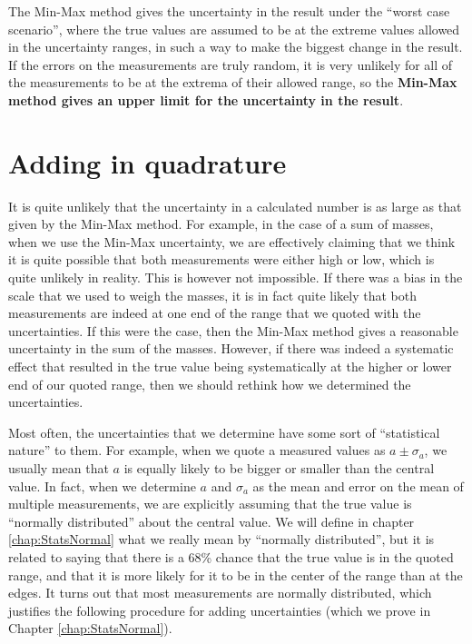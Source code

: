 The Min-Max method gives the uncertainty in the result under the ``worst case scenario'', where the true values are assumed to be at the extreme values allowed in the uncertainty ranges, in such a way to make the biggest change in the result. If the errors on the measurements are truly random, it is very unlikely for all of the measurements to be at the extrema of their allowed range, so the \textbf{Min-Max method gives an upper limit for the uncertainty in the result}. 

\section{Adding in quadrature}
It is quite unlikely that the uncertainty in a calculated number is as large as that given by the Min-Max method. For example, in the case of a sum of masses, when we use the Min-Max uncertainty, we are effectively claiming that we think it is quite possible that both measurements were either high or low, which is quite unlikely in reality. This is however not impossible. If there was a bias in the scale that we used to weigh the masses, it is in fact quite likely that both measurements are indeed at one end of the range that we quoted with the uncertainties. If this were the case, then the Min-Max method gives a reasonable uncertainty in the sum of the masses. However, if there was indeed a systematic effect that resulted in the true value being systematically at the higher or lower end of our quoted range, then we should rethink how we determined the uncertainties.

Most often, the uncertainties that we determine have some sort of ``statistical nature'' to them. For example, when we quote a measured values as $a\pm \sigma_a$, we usually mean that $a$ is equally likely to be bigger or smaller than the central value. In fact, when we determine $a$ and $\sigma_a$ as the mean and error on the mean of multiple measurements, we are explicitly assuming that the true value is ``normally distributed'' about the central value. We will define in chapter \ref{chap:StatsNormal} what we really mean by ``normally distributed'', but it is related to saying that there is a 68\% chance that the true value is in the quoted range, and that it is more likely for it to be in the center of the range than at the edges. It turns out that most measurements are normally distributed, which justifies the following procedure for adding uncertainties (which we prove in Chapter \ref{chap:StatsNormal}).

